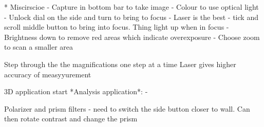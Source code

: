 
* Miscirscioe
- Capture in bottom bar to take image
- Colour to use optical light
- Unlock dial on the side and turn to bring to focus
- Laser is the best - tick and scroll middle button to bring into focus. Thing light up when in focus
- Brightness down to remove red areas which indicate overexposure
- Choose zoom to scan a smaller area

Step through the the magnifications one step at a time
Laser gives higher accuracy of measyyurement

3D application start
*Analysis application*:
-

Polarizer and prism filters - need to switch the side button closer to wall. Can then rotate contrast and change the prism
